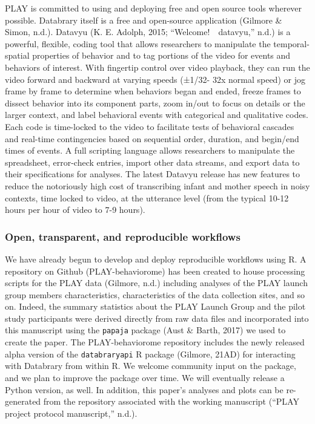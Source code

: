 \documentclass[english,man]{apa6}
\theoremstyle{definition}
\theoremstyle{definition}
\theoremstyle{definition}
\theoremstyle{remark}
\begin{document}
PLAY is committed to using and deploying free and open source tools
wherever possible. Databrary itself is a free and open-source
application (Gilmore \& Simon, n.d.). Datavyu (K. E. Adolph, 2015;
``Welcome!~\textbar{}\textbar{}~datavyu,'' n.d.) is a powerful,
flexible, coding tool that allows researchers to manipulate the
temporal-spatial properties of behavior and to tag portions of the video
for events and behaviors of interest. With fingertip control over video
playback, they can run the video forward and backward at varying speeds
(±1/32- 32x normal speed) or jog frame by frame to determine when
behaviors began and ended, freeze frames to dissect behavior into its
component parts, zoom in/out to focus on details or the larger context,
and label behavioral events with categorical and qualitative codes. Each
code is time-locked to the video to facilitate tests of behavioral
cascades and real-time contingencies based on sequential order,
duration, and begin/end times of events. A full scripting language
allows researchers to manipulate the spreadsheet, error-check entries,
import other data streams, and export data to their specifications for
analyses. The latest Datavyu release has new features to reduce the
notoriously high cost of transcribing infant and mother speech in noisy
contexts, time locked to video, at the utterance level (from the typical
10-12 hours per hour of video to 7-9 hours).

\subsubsection{Open, transparent, and reproducible
workflows}\label{open-transparent-and-reproducible-workflows}

We have already begun to develop and deploy reproducible workflows using
R. A repository on Github (PLAY-behaviorome) has been created to house
processing scripts for the PLAY data (Gilmore, n.d.) including analyses
of the PLAY launch group members characteristics, characteristics of the
data collection sites, and so on. Indeed, the summary statistics about
the PLAY Launch Group and the pilot study participants were derived
directly from raw data files and incorporated into this manuscript using
the \texttt{papaja} package (Aust \& Barth, 2017) we used to create the
paper. The PLAY-behaviorome repository includes the newly released alpha
version of the \texttt{databraryapi} R package (Gilmore, 21AD) for
interacting with Databrary from within R. We welcome community input on
the package, and we plan to improve the package over time. We will
eventually release a Python version, as well. In addition, this paper's
analyses and plots can be re-generated from the repository associated
with the working manuscript (``PLAY project protocol manuscript,''
n.d.).
\end{document}
